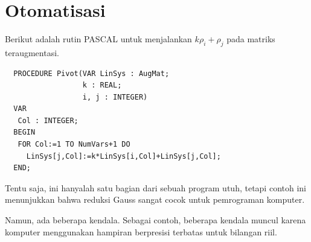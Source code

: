 %
%
%
\section{Otomatisasi}

Berikut adalah rutin PASCAL untuk menjalankan \( k\rho_i+\rho_j \)
pada matriks teraugmentasi.
\begin{center}
\begin{verbatim}
  PROCEDURE Pivot(VAR LinSys : AugMat;
                  k : REAL;
                  i, j : INTEGER)
  VAR
   Col : INTEGER;
  BEGIN
   FOR Col:=1 TO NumVars+1 DO
     LinSys[j,Col]:=k*LinSys[i,Col]+LinSys[j,Col];
  END;
\end{verbatim}
\end{center}
Tentu saja, ini hanyalah satu bagian dari sebuah program utuh, tetapi
contoh ini menunjukkan bahwa reduksi Gauss sangat cocok untuk pemrograman komputer.

Namun, ada beberapa kendala.
Sebagai contoh, beberapa kendala muncul karena komputer menggunakan
hampiran berpresisi terbatas untuk bilangan riil.

